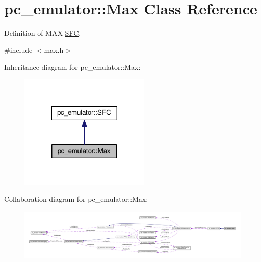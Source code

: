 \hypertarget{classpc__emulator_1_1Max}{}\section{pc\+\_\+emulator\+:\+:Max Class Reference}
\label{classpc__emulator_1_1Max}


Definition of M\+AX \hyperlink{classpc__emulator_1_1SFC}{S\+FC}.  




{\ttfamily \#include $<$max.\+h$>$}



Inheritance diagram for pc\+\_\+emulator\+:\+:Max\+:
\nopagebreak
\begin{figure}[H]
\begin{center}
\leavevmode
\includegraphics[width=176pt]{classpc__emulator_1_1Max__inherit__graph}
\end{center}
\end{figure}


Collaboration diagram for pc\+\_\+emulator\+:\+:Max\+:
\nopagebreak
\begin{figure}[H]
\begin{center}
\leavevmode
\includegraphics[width=350pt]{classpc__emulator_1_1Max__coll__graph}
\end{center}
\end{figure}
